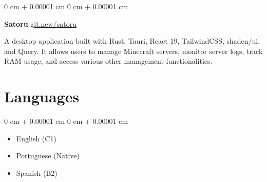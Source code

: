 \documentclass[10pt, letterpaper]{article}
\newenvironment{highlights}{ \begin{itemize}[ topsep=0.10 cm, parsep=0.10 cm, partopsep=0pt,
itemsep=0pt, leftmargin=0 cm + 10pt ] }{ \end{itemize} } %
\newenvironment{onecolentry}{ \begin{adjustwidth}{ 0 cm + 0.00001 cm }{ 0 cm + 0.00001 cm }
}{ \end{adjustwidth} } %
\newenvironment{twocolentry}[2][]{ \onecolentry \def\secondColumn{#2} \setcolumnwidth{\fill, 4.5 cm}
\begin{paracol}{2} }{ \switchcolumn \raggedleft \secondColumn \end{paracol}
\endonecolentry } %
\begin{document}
	\vspace{0.2cm}

	\begin{twocolentry}
		{\href{https://git.new/satoru}{git.new/satoru}} \textbf{Satoru}
	\end{twocolentry}

	\vspace{0.10cm}
	A desktop application built with Rust, Tauri, React 19, TailwindCSS, shadcn/ui,
	and Query. It allows users to manage Minecraft servers, monitor server logs,
	track RAM usage, and access various other management functionalities.

	\section{Languages}

	\begin{onecolentry}
		\begin{highlights}
			\item English (C1)
			\item Portuguese (Native)
			\item Spanish (B2)
		\end{highlights}
	\end{onecolentry}
\end{document}
